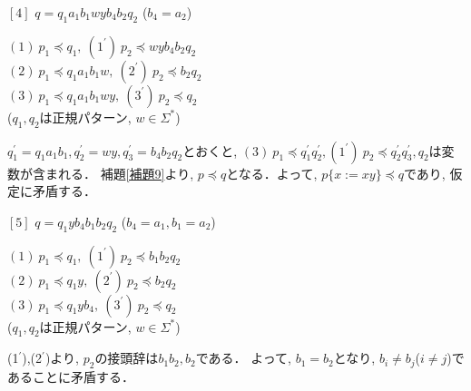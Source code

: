 \noindent $[4]$ $q=q_{1}a_{1}b_{1}wyb_{4}b_{2}q_{2}$ ($b_{4}=a_{2}$)
\medskip

\indent$(1) \ p_{1} \preceq q_{1}, \ (1^{\prime}) \ p_{2} \preceq wyb_{4}b_{2}q_{2}$ \\
\indent $(2) \ p_{1} \preceq q_{1}a_{1}b_{1}w, \ (2^{\prime}) \ p_{2} \preceq b_{2}q_{2}$ \\
\indent $(3) \ p_{1} \preceq q_{1}a_{1}b_{1}wy, \ (3^{\prime}) \ p_{2} \preceq q_{2}$\\ 
\indent ($q_{1}, q_{2}$は正規パターン, $w \in \Sigma^{\ast}$)
\medskip

$q_{1}^{\prime} = q_{1}a_{1}b_{1}, q_{2}^{\prime} = wy, q_{3}^{\prime} = b_{4}b_{2}q_{2}$とおくと, $(3) \ p_{1} \preceq q_{1}^{\prime}q_{2}^{\prime}, (1^{\prime}) \ p_{2} \preceq q_{2}^{\prime}q_{3}^{\prime}, q_{2}$は変数が含まれる．
補題\ref{補題9}より, $p \preceq q$となる．よって, $p \{ x:=xy \} \preceq q$であり,
仮定に矛盾する． 
\medskip

\noindent $[5]$ $q=q_{1}yb_{4}b_{1}b_{2}q_{2}$ ($b_{4}=a_{1}, b_{1}=a_{2}$)
\medskip

\indent$(1) \ p_{1} \preceq q_{1}, \ (1^{\prime}) \ p_{2} \preceq b_{1}b_{2}q_{2}$ \\
\indent $(2) \ p_{1} \preceq q_{1}y, \ (2^{\prime}) \ p_{2} \preceq b_{2}q_{2}$ \\
\indent $(3) \ p_{1} \preceq q_{1}yb_{4}, \ (3^{\prime}) \ p_{2} \preceq q_{2}$ \\
\indent ($q_{1}, q_{2}$は正規パターン, $w \in \Sigma^{\ast}$)
\medskip

(1$^{\prime}$),(2$^{\prime}$)より, $p_{2}$の接頭辞は$b_{1}b_{2}, b_{2}$である．
よって, $b_{1}=b_{2}$となり, $b_{i} \ne b_{j}$($i \ne j$)であることに矛盾する．

